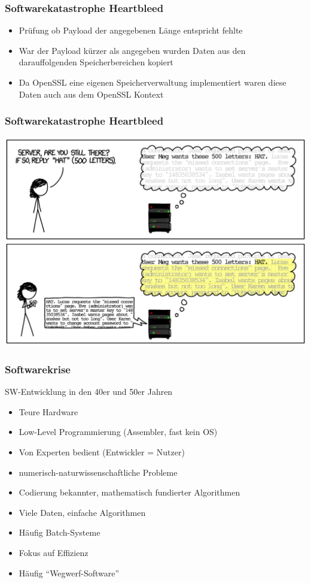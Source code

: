 \begin{frame}
\frametitle{Softwarekatastrophe Heartbleed}
	\begin{itemize}
		\item Prüfung ob Payload der angegebenen Länge entspricht fehlte
		\item War der Payload kürzer als angegeben wurden Daten aus den darauffolgenden
		Speicherbereichen kopiert
		\item Da OpenSSL eine eigenen Speicherverwaltung implementiert waren diese Daten
		auch aus dem OpenSSL Kontext
	\end{itemize}
\end{frame}

\begin{frame}
\frametitle{Softwarekatastrophe Heartbleed}
	\center\includegraphics[width=1\textwidth,
	keepaspectratio=true]{bilder/heartbleed2.png}
\end{frame}

\begin{frame}
\frametitle{Softwarekrise}
	SW-Entwicklung in den 40er und 50er Jahren
	\small
	\begin{itemize}
		\item Teure Hardware
		\item Low-Level Programmierung (Assembler, fast kein OS)
		\item Von Experten bedient (Entwickler = Nutzer)
		\item numerisch-naturwissenschaftliche Probleme
	  	\item Codierung bekannter, mathematisch fundierter Algorithmen
	 	\item Viele Daten, einfache Algorithmen
		\item Häufig Batch-Systeme
		\item Fokus auf Effizienz
		\item Häufig ``Wegwerf-Software''
	\end{itemize}
	\normalsize
\end{frame}

